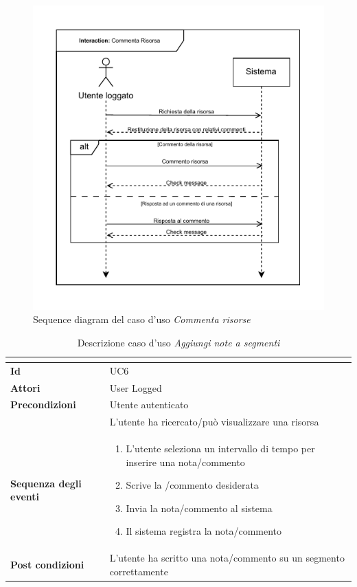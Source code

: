 \documentclass[a4paper]{article}
\begin{document}
\begin{figure}[H]
    \centering
    \includegraphics{./figures/commenta_risorsa_sd}
    \caption{Sequence diagram del caso d'uso \textit{Commenta risorse}}
    \label{fig:sd_commenta_risorsa}
\end{figure}

\begin{table}[H]
    \centering
    \renewcommand{\arraystretch}{1.5}
    \begin{tabular}{|>{\bfseries}l|p{10cm}|}
        \hline
        \multicolumn{2}{|c|}{\textbf{Caso d'uso: Aggiungi note a segmenti}} \\
        \hline
        \textbf{Id} & UC6 \\ \hline
        \textbf{Attori} & User Logged \\ \hline
        \textbf{Precondizioni} & Utente autenticato \\
        & L'utente ha ricercato/può visualizzare una risorsa \\ \hline
        \textbf{Sequenza degli eventi} &
        \begin{enumerate}
            \item L'utente seleziona un intervallo di tempo per inserire una nota/commento
            \item Scrive la /commento desiderata
            \item Invia la nota/commento al sistema
            \item Il sistema registra la nota/commento
        \end{enumerate}\\ \hline
        \textbf{Post condizioni} & L'utente ha scritto una nota/commento su un segmento correttamente \\ \hline
    \end{tabular}
    \caption{Descrizione caso d'uso \textit{Aggiungi note a segmenti}}
    \label{tab:add_notes_to_segments-usecase}
\end{table}
\end{document}

